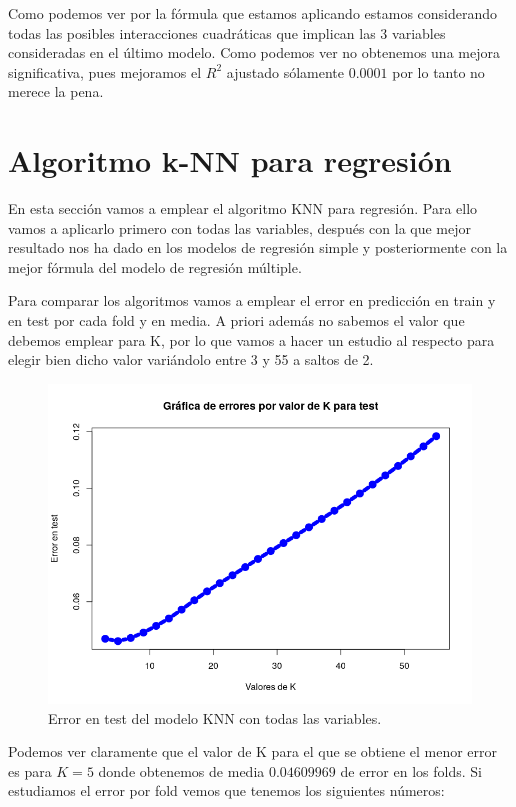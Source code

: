 \documentclass[12pt,a4paper]{article}
\begin{document}
Como podemos ver por la fórmula que estamos aplicando estamos considerando todas las posibles interacciones cuadráticas que implican las 3 variables consideradas en el último modelo. Como podemos ver no obtenemos una mejora significativa, pues mejoramos el $R^2$ ajustado sólamente $0.0001$ por lo tanto no merece la pena.

\section{Algoritmo k-NN para regresión}

En esta sección vamos a emplear el algoritmo KNN para regresión. Para ello vamos a aplicarlo primero con todas las variables, después con la que mejor resultado nos ha dado en los modelos de regresión simple y posteriormente con la mejor fórmula del modelo de regresión múltiple.

Para comparar los algoritmos vamos a emplear el error en predicción en train y en test por cada fold y en media. A priori además no sabemos el valor que debemos emplear para K, por lo que vamos a hacer un estudio al respecto para elegir bien dicho valor variándolo entre 3 y 55 a saltos de 2.

\begin{figure}[H]
	\centering 
	\includegraphics[scale=0.6]{./Imagenes/Regresion/knn1.png}
	\caption{Error en test del modelo KNN con todas las variables.}
\end{figure}

Podemos ver claramente que el valor de K para el que se obtiene el menor error es para $K=5$ donde obtenemos de media $0.04609969$ de error en los folds. Si estudiamos el error por fold vemos que tenemos los siguientes números:
\end{document}

